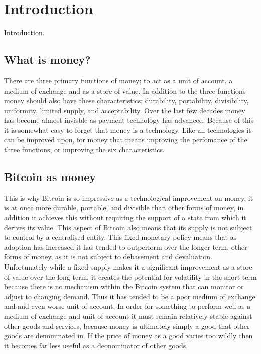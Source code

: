 \section{Introduction}

Introduction. \\

\subsection{What is money?}

There are three primary functions of money; to act as a unit of account, a medium of exchange and as a store of value. In addition to the three functions money should also have these characteristics; durability, portability, divisibility, uniformity, limited supply, and acceptability. Over the last few decades money has become almost invisble as payment technology has advanced. Because of this it is somewhat easy to forget that money is a technology. Like all technologies it can be improved upon, for money that means improving the perfomance of the three functions, or improving the six characteristics. 

\subsection{Bitcoin as money}

This is why Bitcoin is so impressive as a technological improvement on money, it is at once more durable, portable, and divisible than other forms of money, in addition it achieves this without requiring the support of a state from which it derives its value. This aspect of Bitcoin also means that its supply is not subject to control by a centralised entity. This fixed monetary policy means that as adoption has increased it has tended to outperform over the longer term, other forms of money, as it is not subject to debasement and devaluation. Unfortunately while a fixed supply makes it a significant improvement as a store of value over the long term, it creates the potential for volatility in the short term because there is no mechanism within the Bitcoin system that can monitor or adjust to changing demand. Thus it has tended to be a poor medium of exchange and and even worse unit of account. In order for something to perform well as a medium of exchange and unit of account it must remain relatively stable against other goods and services, because money is ultimately simply a good that other goods are denominated in. If the price of money as a good varies too wildly then it becomes far less useful as a deonominator of other goods. \\

